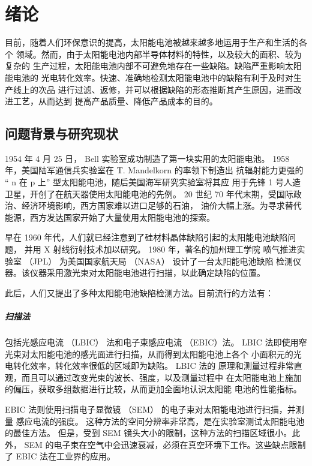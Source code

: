 \chapter{绪论}

目前，随着人们环保意识的提高，太阳能电池被越来越多地运用于生产和生活的各个
领域。然而，由于太阳能电池内部半导体材料的特性，以及较大的面积、较为复杂的
生产过程，太阳能电池内部不可避免地存在一些缺陷。缺陷严重影响太阳能电池的
光电转化效率。快速、准确地检测太阳能电池中的缺陷有利于及时对生产线上的次品
进行过滤、返修，并可以根据缺陷的形态推断其产生原因，进而改进工艺，从而达到
提高产品质量、降低产品成本的目的。

\section{问题背景与研究现状}

1954 年 4 月 25 日， Bell 实验室成功制造了第一块实用的太阳能电池。
\cite{First} 1958 年，美国陆军通信兵实验室在 T. Mandelkorn 的率领下制造出
抗辐射能力更强的 “ n 在 p 上” 型太阳能电池，随后美国海军研究实验室将其应
用于先锋 1 号人造卫星，开创了在航天器使用太阳能电池的先例。\cite{Vanguard}
20 世纪 70 年代末期，受国际政治、经济环境影响，西方国家难以进口足够的石油，
油价大幅上涨。为寻求替代能源，西方发达国家开始了大量使用太阳能电池的探索。

早在 1960 年代，人们就已经注意到了硅材料晶体缺陷引起的太阳能电池缺陷问题，
并用 X 射线衍射技术加以研究。\cite{SiliconXray} 1980 年，著名的加州理工学院
喷气推进实验室 （JPL） 为美国国家航天局 （NASA） 设计了一台太阳能电池缺陷
检测仪器。该仪器采用激光束对太阳能电池进行扫描，以此确定缺陷的位置。
\cite{JPLDefectAnalyzer}

此后，人们又提出了多种太阳能电池缺陷检测方法。目前流行的方法有：

\paragraph{扫描法} 包括光感应电流 （LBIC） 法和电子束感应电流 （EBIC）法。
LBIC 法即使用窄光束对太阳能电池的感光面进行扫描，从而得到太阳能电池上各个
小面积元的光电转化效率，转化效率很低的区域即为缺陷。\cite{LBIC} LBIC 法的
原理和测量过程非常直观，而且可以通过改变光束的波长、强度，以及测量过程中
在太阳能电池上施加的偏压，获取多组数据进行比较，从而更加全面地认识太阳能
电池的性能指标。\cite{LBICEnc}

EBIC 法则使用扫描电子显微镜 （SEM） 的电子束对太阳能电池进行扫描，并测量
感应电流的强度。\cite{EBIC}
这种方法的空间分辨率非常高，是在实验室测试太阳能电池的最佳方法。
但是，受到 SEM 镜头大小的限制，这种方法的扫描区域很小。此外，
SEM 的电子束在空气中会迅速衰减，必须在真空环境下工作。这些缺点限制了 EBIC
法在工业界的应用。

